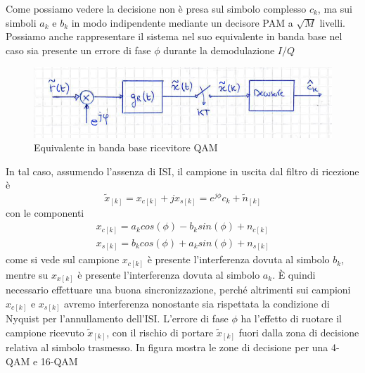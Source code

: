         Come possiamo vedere la decisione non è presa sul simbolo complesso $c_k$, ma sui simboli $a_k$ e $b_k$ in modo 
        indipendente mediante un decisore PAM a $\sqrt{M}$ livelli. Possiamo anche rappresentare il sistema nel suo
        equivalente in banda base nel caso sia presente un errore di fase $\phi$ durante la demodulazione $I/Q$
        \begin{figure}[H]
            \centering
            \includegraphics[width = 12cm]{media/equivalente in banda base ricevitore qam.png}
            \caption{Equivalente in banda base ricevitore QAM}
        \end{figure}
        In tal caso, assumendo l'assenza di ISI, il campione in uscita dal filtro di ricezione è 
        \[
            \tilde{x}_{[k]} = x_{c[k]}+ jx_{s[k]} = e^{j\phi}c_k+\tilde{n}_{[k]}  
        \]
        con le componenti 
        \begin{gather}
            x_{c[k]} = a_k cos(\phi) - b_k sin(\phi) + n_{c[k]}\nonumber \\
            x_{s[k]} = b_k cos(\phi) + a_k sin(\phi) + n_{s[k]}\nonumber
        \end{gather}
	    come si vede sul campione $x_{c[k]}$ è presente l'interferenza dovuta al simbolo $b_k$, mentre su $x_{x[k]}$ 
        è presente l'interferenza dovuta al simbolo $a_k$. È quindi necessario effettuare una buona sincronizzazione,  
        perché altrimenti sui campioni $x_{c[k]}$ e $x_{s[k]}$ avremo interferenza nonostante sia rispettata la condizione 
        di Nyquist per l'annullamento dell'ISI. L'errore di fase $\phi$ ha l'effetto di ruotare il campione ricevuto 
        $\tilde{x}_{[k]}$, con il rischio di portare $\tilde{x}_{[k]}$ fuori dalla zona di decisione relativa al simbolo 
        trasmesso. In figura mostra le zone di decisione per una 4-QAM e 16-QAM
